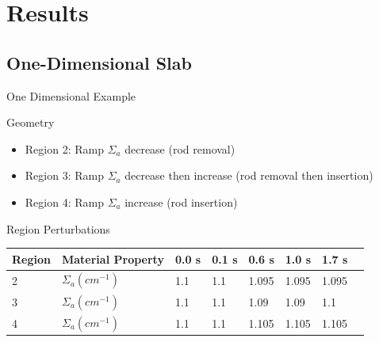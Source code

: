\documentclass[8pt,xcolor=dvipnames]{beamer}
\begin{document}
\section{Results}

\subsection{One-Dimensional Slab}

\begin{frame}{One Dimensional Example}

\begin{block}{Geometry}
\begin{figure}
\begin{center}
\end{center}
\end{figure}
\begin{itemize}
\item Region 2: Ramp $\Sigma_a$ decrease (rod removal)
\item Region 3: Ramp $\Sigma_a$ decrease then increase (rod removal then insertion)
\item Region 4: Ramp $\Sigma_a$ increase (rod insertion)
\end{itemize}
\end{block}

\begin{block}{Region Perturbations}
\centering
\begin{tabular}{llllllll}
\hline
Region & Material Property & 0.0 s & 0.1 s & 0.6 s & 1.0 s & 1.7 s \\
\hline
2 & $\Sigma_{a} (cm^{-1})$ & 1.1 & 1.1 & 1.095 & 1.095 & 1.095 \\
3 & $\Sigma_{a} (cm^{-1})$ & 1.1 & 1.1 & 1.09 & 1.09 & 1.1 \\
4 & $\Sigma_{a} (cm^{-1})$ & 1.1 & 1.1 & 1.105 & 1.105 & 1.105 \\
\hline
\end{tabular}
\end{block}

\end{frame}
\end{document}
